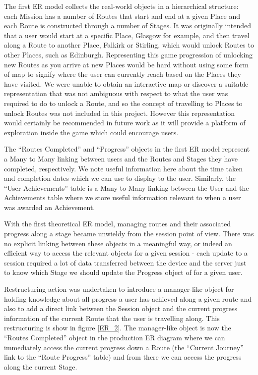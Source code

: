 The first ER model collects the real-world objects in a hierarchical
structure: each Mission has a number of Routes that start and end at a
given Place and each Route is constructed through a number of
Stages. It was originally intended that a user would start at a
specific Place, Glasgow for example, and then travel along a Route to
another Place, Falkirk or Stirling, which would unlock Routes to other
Places, such as Edinburgh. Representing this game progression of
unlocking new Routes as you arrive at new Places would be hard without
using some form of map to signify where the user can currently reach
based on the Places they have visited. We were unable to obtain an
interactive map or discover a suitable representation that was not
ambiguous with respect to what the user was required to do to unlock a
Route, and so the concept of travelling to Places to unlock Routes was
not included in this project. However this representation would
certainly be recommended in future work as it will provide a platform
of exploration inside the game which could encourage users.

The ``Routes Completed'' and ``Progress'' objects in the first ER
model represent a Many to Many linking between users and the Routes
and Stages they have completed, respectively. We note useful
information here about the time taken and completion dates which we
can use to display to the user. Similarly, the ``User Achievements''
table is a Many to Many linking between the User and the Achievements
table where we store useful information relevant to when a user was
awarded an Achievement.  

With the first theoretical ER model, managing routes and their
associated progress along a stage became unwieldy from the session
point of view. There was no explicit linking between these objects in
a meaningful way, or indeed an efficient way to access the relevant
objects for a given session - each update to a session required a lot
of data transferred between the device and the server just to know
which Stage we should update the Progress object of for a given user.

Restructuring action was undertaken to introduce a manager-like object
for holding knowledge about all progress a user has achieved along a
given route and also to add a direct link between the Session object
and the current progress information of the current Route that the
user is travelling along. This restructuring is show in figure
\ref{ER_2}. The manager-like object is now the ``Routes Completed''
object in the production ER diagram where we can immediately access
the current progress down a Route (the ``Current Journey'' link to the
``Route Progress'' table) and from there we can access the progress
along the current Stage. 

